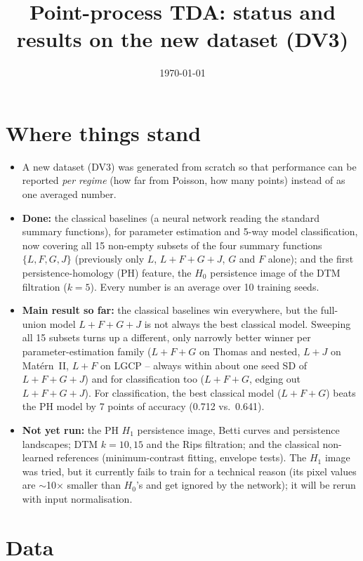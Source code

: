 \documentclass[10pt,a4paper]{article}
\title{\textbf{Point-process TDA: status and results on the new dataset (DV3)}}
\date{\today}
\begin{document}
\maketitle

\section{Where things stand}

\begin{itemize}
  \item A new dataset (DV3) was generated from scratch so that performance can be reported \emph{per regime} (how far from Poisson, how many points) instead of as one averaged number.
  \item \textbf{Done:} the classical baselines (a neural network reading the standard summary functions), for parameter estimation and 5-way model classification, now covering all 15 non-empty subsets of the four summary functions $\{L,F,G,J\}$ (previously only $L$, $L{+}F{+}G{+}J$, $G$ and $F$ alone); and the first persistence-homology (PH) feature, the $H_0$ persistence image of the DTM filtration ($k=5$). Every number is an average over 10 training seeds.
  \item \textbf{Main result so far:} the classical baselines win everywhere, but the full-union model $L{+}F{+}G{+}J$ is not always the best classical model. Sweeping all 15 subsets turns up a different, only narrowly better winner per parameter-estimation family ($L{+}F{+}G$ on Thomas and nested, $L{+}J$ on Mat\'ern~II, $L{+}F$ on LGCP -- always within about one seed SD of $L{+}F{+}G{+}J$) and for classification too ($L{+}F{+}G$, edging out $L{+}F{+}G{+}J$). For classification, the best classical model ($L{+}F{+}G$) beats the PH model by 7 points of accuracy (0.712 vs.\ 0.641).
  \item \textbf{Not yet run:} the PH $H_1$ persistence image, Betti curves and persistence landscapes; DTM $k=10, 15$ and the Rips filtration; and the classical non-learned references (minimum-contrast fitting, envelope tests). The $H_1$ image was tried, but it currently fails to train for a technical reason (its pixel values are $\sim$10$\times$ smaller than $H_0$'s and get ignored by the network); it will be rerun with input normalisation.
\end{itemize}

\section{Data}
\end{document}
